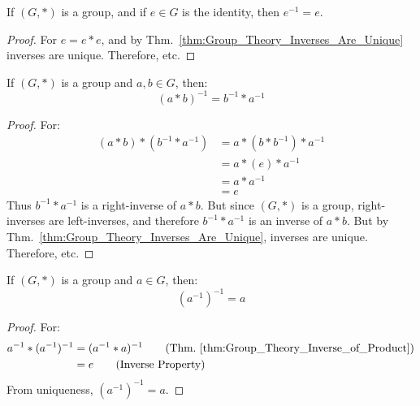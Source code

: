         \begin{theorem}
            If $(G,*)$ is a group, and if $e\in{G}$ is the identity,
            then $e^{-1}=e$.
        \end{theorem}
        \begin{proof}
            For $e=e*e$, and by Thm.~\ref{thm:Group_Theory_Inverses_Are_Unique}
            inverses are unique. Therefore, etc.
        \end{proof}
        \begin{theorem}
            \label{thm:Group_Theory_Inverse_of_Product}
            If $(G,*)$ is a group and $a,b\in G$, then:
            \begin{equation}
                (a*b)^{-1} = b^{-1}*a^{-1}
            \end{equation}
        \end{theorem}
        \begin{proof}
            For:
            \begin{align}
                (a*b)*(b^{-1}*a^{-1})&=
                a*(b*b^{-1})*a^{-1}
                \tag{Associative Property}\\
                &=a*(e)*a^{-1}
                \tag{Inverse Property}\\
                &=a*a^{-1}
                \tag{Identitive Property}\\
                &=e
                \tag{Inverse Property}
            \end{align}
            Thus $b^{-1}*a^{-1}$ is a right-inverse of $a*b$.
            But since $(G,*)$ is a group, right-inverses are
            left-inverses, and therefore $b^{-1}*a^{-1}$ is
            an inverse of $a*b$. But by
            Thm.~\ref{thm:Group_Theory_Inverses_Are_Unique},
            inverses are unique. Therefore, etc.
        \end{proof}
        \begin{theorem}
            If $(G,*)$ is a group and $a\in{G}$, then:
            \begin{equation}
                (a^{-1})^{-1}=a
            \end{equation}
        \end{theorem}
        \begin{proof}
            For:
            \begin{align}
                a^{-1}*(a^{-1})^{-1}
                &=(a^{-1}* a)^{-1}
                \tag{Thm.~\ref{thm:Group_Theory_Inverse_of_Product}}\\
                &=e
                \tag{Inverse Property}
            \end{align}
            From uniqueness, $(a^{-1})^{-1}=a$.
        \end{proof}
